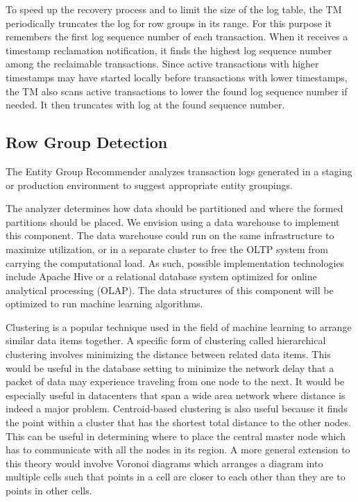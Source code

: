 \documentclass[10pt,final,journal]{IEEEtran}
\begin{document}
To speed up the recovery process and to limit the size of the log table, the TM periodically truncates the log for row groups in its range. For this purpose it remembers the first log sequence number of each transaction. When it receives a timestamp reclamation notification, it finds the highest log sequence number among the reclaimable transactions. Since active transactions with higher timestamps may have started locally before transactions with lower timestamps, the TM also scans active transactions to lower the found log sequence number if needed. It then truncates with log at the found sequence number.

\subsection{Row Group Detection}
The Entity Group Recommender analyzes transaction logs generated in a staging or production environment to suggest appropriate entity groupings.

The analyzer determines how data should be partitioned and where the formed partitions should be placed. We envision using a data warehouse to implement this component. The data warehouse could run on the same infrastructure to maximize utilization, or in a separate cluster to free the OLTP system from carrying the computational load. As such, possible implementation technologies include Apache Hive or a relational database system optimized for online analytical processing (OLAP). The data structures of this component will be optimized to run machine learning algorithms.

Clustering is a popular technique used in the field of machine learning to arrange similar data items together.  A specific form of clustering called hierarchical clustering involves minimizing the distance between related data items.  This would be useful in the database setting to minimize the network delay that a packet of data may experience traveling from one node to the next.  It would be especially useful in datacenters that span a wide area network where distance is indeed a major problem.  Centroid-based clustering is also useful because it finds the point within a cluster that has the shortest total distance to the other nodes.  This can be useful in determining where to place the central master node which has to communicate with all the nodes in its region.  A more general extension to this theory would involve Voronoi diagrams which arranges a diagram into multiple cells such that points in a cell are closer to each other than they are to points in other cells.
\end{document}
